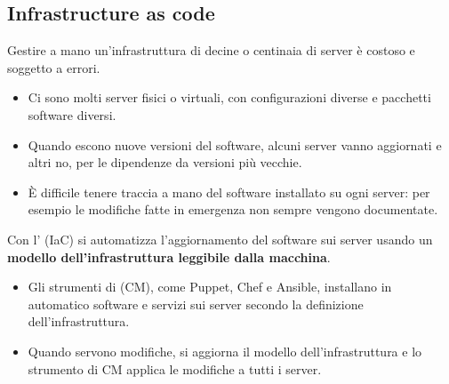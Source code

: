 \subsection{Infrastructure as code}
\label{sec:devops-iac}

Gestire a mano un'infrastruttura di decine o centinaia di server è costoso e soggetto a errori.
\begin{itemize}
  \item Ci sono molti server fisici o virtuali, con configurazioni diverse e pacchetti software diversi.
  \item Quando escono nuove versioni del software, alcuni server vanno aggiornati e altri no, per le dipendenze da
    versioni più vecchie.
  \item È difficile tenere traccia a mano del software installato su ogni server: per esempio le modifiche fatte in
    emergenza non sempre vengono documentate.
\end{itemize}

\begin{definizione}
Con l' (IaC) si automatizza l'aggiornamento del software sui server usando un
\textbf{modello dell'infrastruttura leggibile dalla macchina}.
\begin{itemize}
  \item Gli strumenti di  (CM), come Puppet, Chef e Ansible, installano in automatico
    software e servizi sui server secondo la definizione dell'infrastruttura.
  \item Quando servono modifiche, si aggiorna il modello dell'infrastruttura e lo strumento di CM applica le modifiche a
    tutti i server.
\end{itemize}
\end{definizione}

